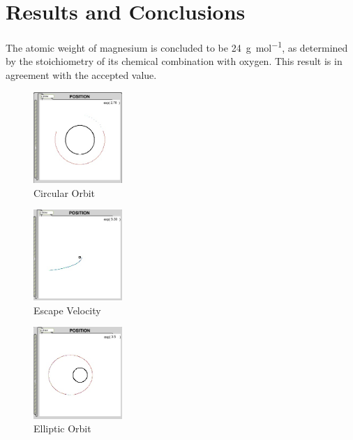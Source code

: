 \documentclass{article}
\begin{document}

\section{Results and Conclusions}

The atomic weight of magnesium is concluded to be \SI{24}{\gram\per\mol}, as determined by the stoichiometry of its chemical combination with oxygen. This result is in agreement with the accepted value.

\begin{figure}[h]
\begin{center}
\includegraphics[width=0.3\textwidth]{circular} %
\caption{Circular Orbit}
\end{center}
\end{figure}

\begin{figure}[h]
\begin{center}
\includegraphics[width=0.3\textwidth]{escape} %
\caption{Escape Velocity}
\end{center}
\end{figure}

\begin{figure}[h]
\begin{center}
\includegraphics[width=0.3\textwidth]{elliptic} %
\caption{Elliptic Orbit}
\end{center}
\end{figure}
\end{document}
